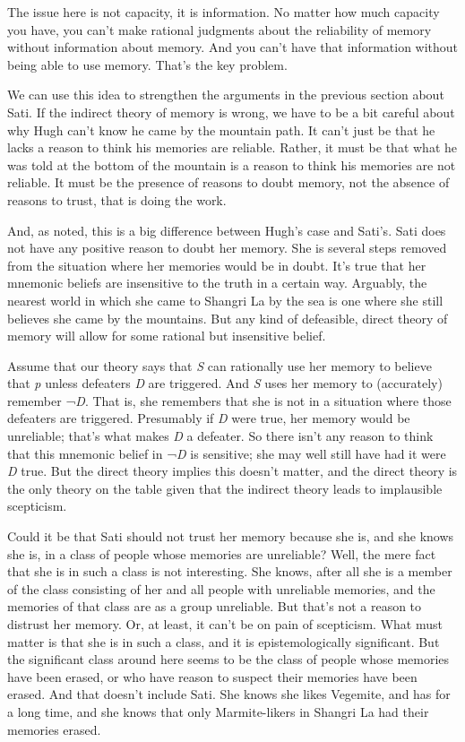 \documentclass[
  10pt,
  letterpaper,
  DIV=11,
  numbers=noendperiod,
  twoside]{scrartcl}
\begin{document}
The issue here is not capacity, it is information. No matter how much
capacity you have, you can't make rational judgments about the
reliability of memory without information about memory. And you can't
have that information without being able to use memory. That's the key
problem.

We can use this idea to strengthen the arguments in the previous section
about Sati. If the indirect theory of memory is wrong, we have to be a
bit careful about why Hugh can't know he came by the mountain path. It
can't just be that he lacks a reason to think his memories are reliable.
Rather, it must be that what he was told at the bottom of the mountain
is a reason to think his memories are not reliable. It must be the
presence of reasons to doubt memory, not the absence of reasons to
trust, that is doing the work.

And, as noted, this is a big difference between Hugh's case and Sati's.
Sati does not have any positive reason to doubt her memory. She is
several steps removed from the situation where her memories would be in
doubt. It's true that her mnemonic beliefs are insensitive to the truth
in a certain way. Arguably, the nearest world in which she came to
Shangri La by the sea is one where she still believes she came by the
mountains. But any kind of defeasible, direct theory of memory will
allow for some rational but insensitive belief.

Assume that our theory says that \emph{S} can rationally use her memory
to believe that \emph{p} unless defeaters \emph{D} are triggered. And
\emph{S} uses her memory to (accurately) remember ¬\emph{D}. That is,
she remembers that she is not in a situation where those defeaters are
triggered. Presumably if \emph{D} were true, her memory would be
unreliable; that's what makes \emph{D} a defeater. So there isn't any
reason to think that this mnemonic belief in ¬\emph{D} is sensitive; she
may well still have had it were \emph{D} true. But the direct theory
implies this doesn't matter, and the direct theory is the only theory on
the table given that the indirect theory leads to implausible
scepticism.

Could it be that Sati should not trust her memory because she is, and
she knows she is, in a class of people whose memories are unreliable?
Well, the mere fact that she is in such a class is not interesting. She
knows, after all she is a member of the class consisting of her and all
people with unreliable memories, and the memories of that class are as a
group unreliable. But that's not a reason to distrust her memory. Or, at
least, it can't be on pain of scepticism. What must matter is that she
is in such a class, and it is epistemologically significant. But the
significant class around here seems to be the class of people whose
memories have been erased, or who have reason to suspect their memories
have been erased. And that doesn't include Sati. She knows she likes
Vegemite, and has for a long time, and she knows that only
Marmite-likers in Shangri La had their memories erased.
\end{document}
